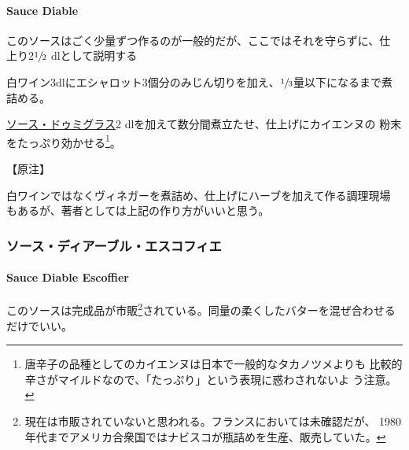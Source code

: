 \hypertarget{sauce-diable}{%
\paragraph{Sauce Diable}\label{sauce-diable}}


このソースはごく少量ずつ作るのが一般的だが、ここではそれを守らずに、仕
上り2\(\sfrac{1}{2}\) dlとして説明する

白ワイン3dlにエシャロット3個分のみじん切りを加え、\(\sfrac{1}{3}\)量以下になるまで煮詰める。

\protect\hyperlink{sauce-demi-glace}{ソース・ドゥミグラス}2
dlを加えて数分間煮立たせ、仕上げにカイエンヌの
粉末をたっぷり効かせる\footnote{唐辛子の品種としてのカイエンヌは日本で一般的なタカノツメよりも
  比較的辛さがマイルドなので、「たっぷり」という表現に惑わされないよ
  う注意。}。

【原注】

白ワインではなくヴィネガーを煮詰め、仕上げにハーブを加えて作る調理現場
もあるが、著者としては上記の作り方がいいと思う。

\maeaki

\hypertarget{ux30bdux30fcux30b9ux30c7ux30a3ux30a2ux30fcux30d6ux30ebux30a8ux30b9ux30b3ux30d5ux30a3ux30a8}{%
\subsubsection{ソース・ディアーブル・エスコフィエ}\label{ux30bdux30fcux30b9ux30c7ux30a3ux30a2ux30fcux30d6ux30ebux30a8ux30b9ux30b3ux30d5ux30a3ux30a8}}

\hypertarget{sauce-diable-escoffier}{%
\paragraph{Sauce Diable Escoffier}\label{sauce-diable-escoffier}}


このソースは完成品が市販\footnote{現在は市販されていないと思われる。フランスにおいては未確認だが、
  1980年代までアメリカ合衆国ではナビスコが瓶詰めを生産、販売していた。}されている。同量の柔くしたバターを混ぜ合わせるだけでいい。

